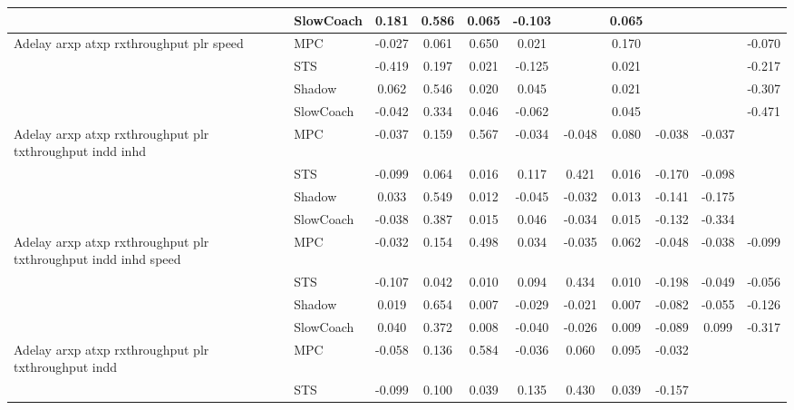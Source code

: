 \begin{tabular}{|l|l|*{9}{c|}}
                              & SlowCoach &    0.181 &     0.586 &     0.065 & -0.103 &     &  0.065 &      &      &       \\
\midrule
Adelay arxp atxp rxthroughput plr speed    & MPC &   -0.027 &     0.061 &     0.650 &  0.021 &     &  0.170 &      &      &   -0.070 \\
                              & STS &   -0.419 &     0.197 &     0.021 & -0.125 &     &  0.021 &      &      &   -0.217 \\
                              & Shadow &    0.062 &     0.546 &     0.020 &  0.045 &     &  0.021 &      &      &   -0.307 \\
                              & SlowCoach &   -0.042 &     0.334 &     0.046 & -0.062 &     &  0.045 &      &      &   -0.471 \\
\midrule
Adelay arxp atxp rxthroughput plr txthroughput indd inhd    & MPC &   -0.037 &     0.159 &     0.567 & -0.034 & -0.048 &  0.080 &  -0.038 &  -0.037 &       \\
                              & STS &   -0.099 &     0.064 &     0.016 &  0.117 &  0.421 &  0.016 &  -0.170 &  -0.098 &       \\
                              & Shadow &    0.033 &     0.549 &     0.012 & -0.045 & -0.032 &  0.013 &  -0.141 &  -0.175 &       \\
                              & SlowCoach &   -0.038 &     0.387 &     0.015 &  0.046 & -0.034 &  0.015 &  -0.132 &  -0.334 &       \\
\midrule
Adelay arxp atxp rxthroughput plr txthroughput indd inhd speed    & MPC &   -0.032 &     0.154 &     0.498 &  0.034 & -0.035 &  0.062 &  -0.048 &  -0.038 &   -0.099 \\
                              & STS &   -0.107 &     0.042 &     0.010 &  0.094 &  0.434 &  0.010 &  -0.198 &  -0.049 &   -0.056 \\
                              & Shadow &    0.019 &     0.654 &     0.007 & -0.029 & -0.021 &  0.007 &  -0.082 &  -0.055 &   -0.126 \\
                              & SlowCoach &    0.040 &     0.372 &     0.008 & -0.040 & -0.026 &  0.009 &  -0.089 &   0.099 &   -0.317 \\
\midrule
Adelay arxp atxp rxthroughput plr txthroughput indd    & MPC &   -0.058 &     0.136 &     0.584 & -0.036 &  0.060 &  0.095 &  -0.032 &      &       \\
                              & STS &   -0.099 &     0.100 &     0.039 &  0.135 &  0.430 &  0.039 &  -0.157 &      &       \\

\end{tabular}
